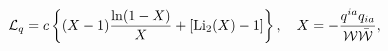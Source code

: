 \begin{equation}\label{2}
{\cal L}_{q}=c\left\{(X-1)\frac{\ln (1-X)}{X}+[{\rm
Li}_{2}(X)-1]\right\}, \quad X=-\frac{q^{ia}q_{ia}}{{\cal
W}\bar{\cal W}} ,
\end{equation}

